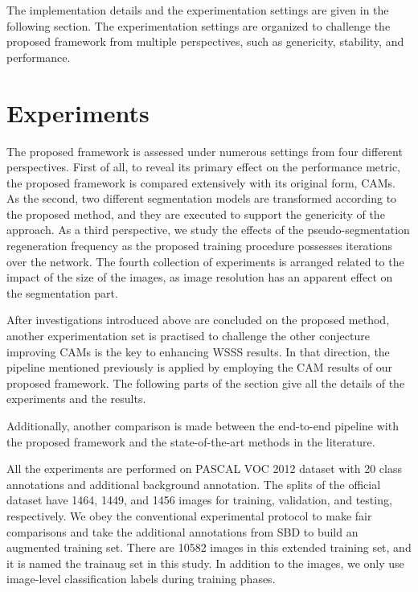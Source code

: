 \documentclass[sn-mathphys]{sn-jnl}
\theoremstyle{thmstyleone}
\theoremstyle{thmstyletwo}\newtheorem{example}{Example}\newtheorem{remark}{Remark}
\theoremstyle{thmstylethree}\newtheorem{definition}{Definition}
\begin{document}
The implementation details and the experimentation settings are given in the following section. The experimentation settings are organized to challenge the proposed framework from multiple perspectives, such as genericity, stability, and performance. 





\section{Experiments}\label{experiments}

The proposed framework is assessed under numerous settings from four different perspectives. First of all, to reveal its primary effect on the performance metric, the proposed framework is compared extensively with its original form, CAMs. As the second, two different segmentation models are transformed according to the proposed method, and they are executed to support the genericity of the approach. As a third perspective, we study the effects of the pseudo-segmentation regeneration frequency as the proposed training procedure possesses iterations over the network. The fourth collection of experiments is arranged related to the impact of the size of the images, as image resolution has an apparent effect on the segmentation part.

After investigations introduced above are concluded on the proposed method, another experimentation set is practised to challenge the other conjecture improving CAMs is the key to enhancing WSSS results. In that direction, the pipeline mentioned previously is applied by employing the CAM results of our proposed framework. The following parts of the section give all the details of the experiments and the results.

Additionally, another comparison is made between the end-to-end pipeline with the proposed framework and the state-of-the-art methods in the literature.

All the experiments are performed on PASCAL VOC 2012 dataset \cite{Everingham10} with 20 class annotations and additional background annotation. The splits of the official dataset have 1464, 1449, and 1456 images for training, validation, and testing, respectively. We obey the conventional experimental protocol to make fair comparisons and take the additional annotations from SBD \cite{BharathICCV2011} to build an augmented training set. There are 10582 images in this extended training set, and it is named the trainaug set in this study. In addition to the images, we only use image-level classification labels during training phases. 
\end{document}
